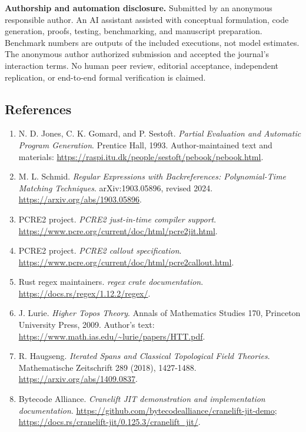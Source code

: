 \documentclass[
  11pt,
]{article}
\providecommand{\tightlist}{%
  \setlength{\itemsep}{0pt}\setlength{\parskip}{0pt}}
\begin{document}
\textbf{Authorship and automation disclosure.} Submitted by an anonymous
responsible author. An AI assistant assisted with conceptual
formulation, code generation, proofs, testing, benchmarking, and
manuscript preparation. Benchmark numbers are outputs of the included
executions, not model estimates. The anonymous author authorized
submission and accepted the journal's interaction terms. No human peer
review, editorial acceptance, independent replication, or end-to-end
formal verification is claimed.

\hypertarget{references}{%
\subsection{References}\label{references}}

\begin{enumerate}
\def\labelenumi{\arabic{enumi}.}
\tightlist
\item
  N. D. Jones, C. K. Gomard, and P. Sestoft. \emph{Partial Evaluation
  and Automatic Program Generation}. Prentice Hall, 1993.
  Author-maintained text and materials:
  \url{https://raspi.itu.dk/people/sestoft/pebook/pebook.html}.
\item
  M. L. Schmid. \emph{Regular Expressions with Backreferences:
  Polynomial-Time Matching Techniques}. arXiv:1903.05896, revised 2024.
  \url{https://arxiv.org/abs/1903.05896}.
\item
  PCRE2 project. \emph{PCRE2 just-in-time compiler support}.
  \url{https://www.pcre.org/current/doc/html/pcre2jit.html}.
\item
  PCRE2 project. \emph{PCRE2 callout specification}.
  \url{https://www.pcre.org/current/doc/html/pcre2callout.html}.
\item
  Rust regex maintainers. \emph{regex crate documentation}.
  \url{https://docs.rs/regex/1.12.2/regex/}.
\item
  J. Lurie. \emph{Higher Topos Theory}. Annals of Mathematics Studies
  170, Princeton University Press, 2009. Author's text:
  \url{https://www.math.ias.edu/~lurie/papers/HTT.pdf}.
\item
  R. Haugseng. \emph{Iterated Spans and Classical Topological Field
  Theories}. Mathematische Zeitschrift 289 (2018), 1427-1488.
  \url{https://arxiv.org/abs/1409.0837}.
\item
  Bytecode Alliance. \emph{Cranelift JIT demonstration and
  implementation documentation}.
  \url{https://github.com/bytecodealliance/cranelift-jit-demo};
  \url{https://docs.rs/cranelift-jit/0.125.3/cranelift_jit/}.

\end{enumerate}
\end{document}
